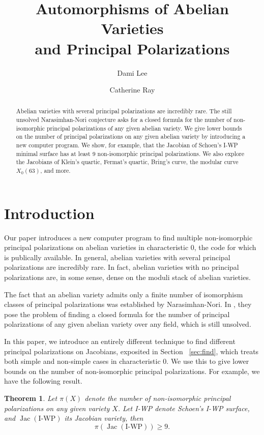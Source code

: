 \documentclass[12pt,reqno]{amsart}
\title[Automorphisms of Abelian Varieties and Principal Polarizations]{Automorphisms of Abelian Varieties \\ and Principal Polarizations}
\author{Dami Lee}
\author{Catherine Ray}
\DeclareMathOperator{\Jac}{Jac}
\newtheorem{theorem}{Theorem}
\theoremstyle{definition}
\theoremstyle{remark}
\begin{document}
  
\maketitle

\begin{abstract} Abelian varieties with several principal polarizations are incredibly rare. The still unsolved Narasimhan-Nori conjecture asks for a closed formula for the number of non-isomorphic principal polarizations of any given abelian variety. We give lower bounds on the number of principal polarizations on any given abelian variety by introducing a new computer program.
We show, for example, that the Jacobian of Schoen's I-WP minimal surface has at least 9 non-isomorphic principal polarizations. We also explore the Jacobians of Klein's quartic, Fermat's quartic, Bring's curve, the modular curve $X_0(63)$, and more.   
\end{abstract}

\section{Introduction}

Our paper introduces a new computer program to find multiple non-isomorphic principal polarizations on abelian varieties in characteristic 0, the code for which is publically available. In general, abelian varieties with several principal polarizations are incredibly rare. In fact, abelian varieties with no principal polarizations are, in some sense, dense on the moduli stack of abelian varieties. %

The fact that an abelian variety admits only a finite number of isomorphism classes of principal polarizations was established by Narasimhan-Nori. In \cite{nn}, they pose the problem of finding a closed formula for the number of principal polarizations of any given abelian variety over any field, which is still unsolved. 

In this paper, we introduce an entirely different technique to find different principal polarizations on Jacobians, exposited in Section ~\ref{sec:find}, which treats both simple and non-simple cases in characteristic 0. We use this to give lower bounds on the number of non-isomorphic principal polarizations. For example, we have the following result. 

\begin{theorem} \label{IWP} Let $\pi(X)$ denote the number of non-isomorphic principal polarizations on any given variety $X$. Let I-WP denote Schoen's I-WP surface, and $\Jac(\text{I-WP})$ its Jacobian variety, then $$\pi(\Jac(\text{I-WP})) \geq 9.$$\end{theorem}
\end{document}

